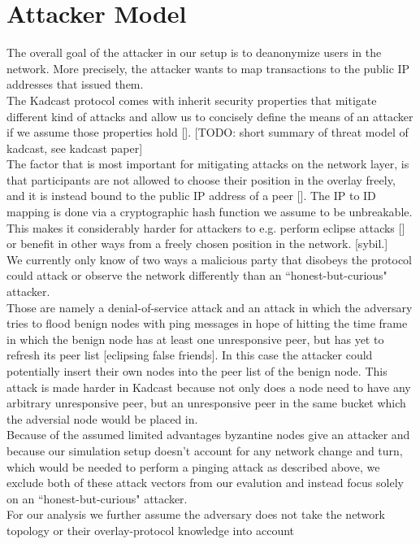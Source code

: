 \section{Attacker Model\label{attacker_model}}
The overall goal of the attacker in our setup is to deanonymize users in
the network.
More precisely, the attacker wants to map transactions to the public IP addresses that issued them. \\
The Kadcast protocol comes with inherit security properties that mitigate different kind of attacks
and allow us to concisely define the means of an attacker if we assume
those properties hold []. [TODO: short summary of threat model of
kadcast, see kadcast paper] \\
The factor that is most important for mitigating attacks on the network layer, is that participants are
not allowed to choose their position in the overlay freely, and it is instead bound to the public IP address of a peer [].
The IP to ID mapping is done via a cryptographic hash function we assume to be unbreakable.
This makes it considerably harder for attackers to e.g. perform eclipse attacks [] or benefit in other ways from
a freely chosen position in the network. [sybil.] \\
We currently only know of two ways a malicious party that disobeys the
protocol could attack or observe the network differently than an ``honest-but-curious" attacker. \\
Those are namely a denial-of-service attack and an attack in which the adversary tries to flood
benign nodes with ping messages in hope of hitting the time frame in which the benign node has at least one unresponsive
peer, but has yet to refresh its peer list [eclipsing false friends]. In
this case the attacker could potentially insert their own nodes into the
peer list of the benign node.
This attack is made harder in Kadcast because not only does a node need
to have any arbitrary unresponsive peer, but an unresponsive peer
in the same bucket which the adversial node would be placed in. \\
Because of the assumed limited advantages byzantine nodes give an attacker and because our simulation setup doesn't account for any network change and turn,
which would be needed to perform a pinging attack as described above,
we exclude both of these attack vectors from our evalution and instead focus solely on an ``honest-but-curious" attacker. \\
For our analysis we further assume the adversary does not take the
network topology or their overlay-protocol knowledge into account
